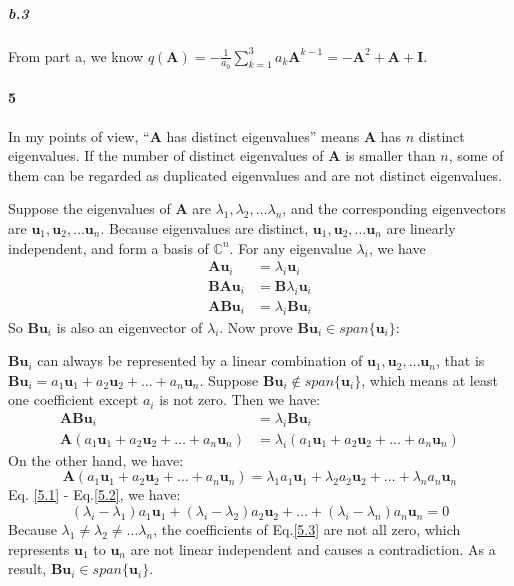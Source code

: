 \documentclass[22pt]{article}
\begin{document}
	\subparagraph{b.3} 
	From part a, we know $q(\mathbf{A}) = -\frac{1}{a_0}\sum_{k=1}^{3}a_k\mathbf{A}^{k-1} = -\mathbf{A}^2+\mathbf{A}+\mathbf{I}$. 


	\paragraph{5} In my points of view, ``$\mathbf{A}$ has distinct eigenvalues'' means $\mathbf{A}$ has $n$ distinct eigenvalues. If the number of distinct eigenvalues of $\mathbf{A}$ is smaller than $n$, some of them can be regarded as duplicated eigenvalues and are not distinct eigenvalues. 

	Suppose the eigenvalues of $\mathbf{A}$ are $\lambda_1,\lambda_2,\dots \lambda_n$, and  the corresponding eigenvectors are $\mathbf{u}_1,\mathbf{u}_2,\dots\mathbf{u}_n$. Because eigenvalues are distinct,  $\mathbf{u}_1,\mathbf{u}_2,\dots\mathbf{u}_n$ are linearly independent, and form a basis of $\mathbb{C}^n$. For any eigenvalue $\lambda_i$, we have 
	\begin{align}
		\mathbf{Au}_i & = \lambda_i\mathbf{u}_i\\
		\mathbf{BAu}_i & = \mathbf{B}\lambda_i\mathbf{u}_i\\
		\mathbf{ABu}_i & = \lambda_i\mathbf{Bu}_i
	\end{align}
	So $\mathbf{Bu}_i$ is also an eigenvector of $\lambda_i$. Now prove $\mathbf{Bu}_i \in span\{\mathbf{u}_i\}$:

	 $\mathbf{Bu}_i$ can always be represented by a linear combination of $\mathbf{u}_1,\mathbf{u}_2,\dots\mathbf{u}_n$, that is $\mathbf{Bu}_i = a_1\mathbf{u}_1+a_2\mathbf{u}_2+\dots+a_n\mathbf{u}_n$. Suppose $\mathbf{Bu}_i \notin span\{\mathbf{u}_i\}$, which means at least one coefficient except $a_i$ is not zero. Then we have:
	 \begin{align}
	 	\mathbf{ABu}_i & = \lambda_i\mathbf{Bu}_i\\
	 	 \label{5.1} \mathbf{A}(a_1\mathbf{u}_1+a_2\mathbf{u}_2+\dots+a_n\mathbf{u}_n) & = \lambda_i( a_1\mathbf{u}_1+a_2\mathbf{u}_2+\dots+a_n\mathbf{u}_n)
	 \end{align}
	 On the other hand, we have: 
	 \begin{equation}
	 	\mathbf{A}(a_1\mathbf{u}_1+a_2\mathbf{u}_2+\dots+a_n\mathbf{u}_n) =  \lambda_1a_1\mathbf{u}_1+\lambda_2a_2\mathbf{u}_2+\dots+\lambda_na_n\mathbf{u}_n \label{5.2}
	 \end{equation}
	 Eq. \ref{5.1} - Eq.\ref{5.2}, we have:
	 \begin{equation}
	 	 (\lambda_i- \lambda_1 )a_1\mathbf{u}_1+(\lambda_i- \lambda_2)a_2\mathbf{u}_2+\dots+(\lambda_i- \lambda_n)a_n\mathbf{u}_n=0 \label{5.3}
	 \end{equation}
	 Because $\lambda_1 \not= \lambda_2 \not= \dots \lambda_n$, the coefficients of Eq.\ref{5.3} are not all zero, which represents $\mathbf{u}_1$ to $\mathbf{u}_n$ are not linear independent and causes a contradiction. As a result, $\mathbf{Bu}_i\in span\{\mathbf{u}_i\}$.
\end{document}
